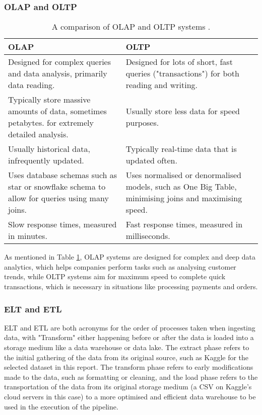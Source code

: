 \subsubsection{OLAP and OLTP}

\begin{table}[H]
    \centering
        \begin{tabular}{ |p{}| p{}|}
            \hline
            \cellcolor{blue!25}OLAP & \cellcolor{blue!25}OLTP\\
            \hline
            Designed for complex queries and data analysis, primarily data reading.
            & Designed for lots of short, fast queries ("transactions") for both reading and writing.\\
            \hline
            Typically store massive amounts of data, sometimes petabytes.
            for extremely detailed analysis. 
            & Usually store less data for speed purposes.\\
            \hline
            Usually historical data, infrequently updated. 
            & Typically real-time data that is updated often.\\
            \hline 
            Uses database schemas such as star or snowflake schema to allow for queries using many joins. 
            & Uses normalised or denormalised models, such as One Big Table, minimising joins and maximising speed.\\
            \hline
            Slow response times, measured in minutes. 
            & Fast response times, measured in milliseconds.\\
            \hline
    \end{tabular}
    \caption{A comparison of OLAP and OLTP systems \autocite{aws_oltp_nodate}.}\label{tab:OLAP-OLTP}
\end{table}

As mentioned in Table \ref{tab:OLAP-OLTP}, OLAP systems are designed for complex and deep data analytics, which helps 
companies perform tasks such as analysing customer trends, while OLTP systems aim for maximum speed to complete quick transactions, 
which is necessary in situations like processing payments and orders.

\subsubsection{ELT and ETL}
ELT and ETL are both acronyms for the order of processes taken when ingesting data, with "Transform" either 
happening before or after the data is loaded into a storage medium like a data warehouse or data lake. 
The extract phase refers to the initial gathering of the data from its original source, such as Kaggle for 
the selected dataset in this report. The transform phase refers to early modifications made to the data, such 
as formatting or cleaning, and the load phase refers to the transportation of the data from its original storage
medium (a CSV on Kaggle's cloud servers in this case) to a more optimised and efficient data warehouse to be used 
in the execution of the pipeline.


